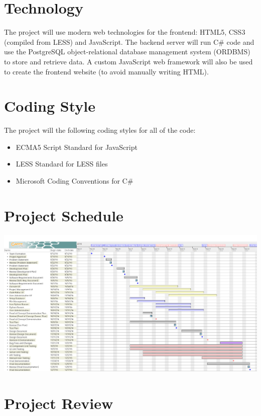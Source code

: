 \documentclass{article}
\begin{document}

\section{Technology}
The project will use modern web technologies for the frontend: HTML5, CSS3
(compiled from LESS) and JavaScript. The backend server will run C\# code and
use the PostgreSQL object-relational database management system (ORDBMS) to
store and retrieve data. A custom JavaScript web framework will also be used to
create the frontend website (to avoid manually writing HTML).

\section{Coding Style}
The project will the following coding styles for all of the code:
\begin{itemize}
  \item ECMA5 Script Standard for JavaScript
  \item LESS Standard for LESS files
  \item Microsoft Coding Conventions for C\#
\end{itemize}

\section{Project Schedule}

\includegraphics[width=\textwidth]{schedule}

\section{Project Review}
\end{document}
